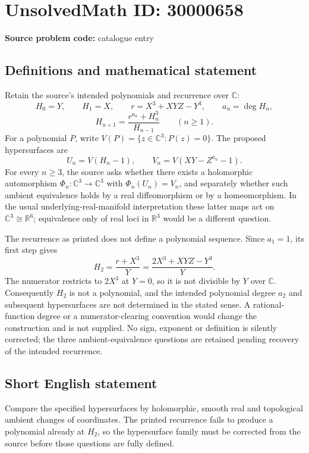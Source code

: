 \documentclass[11pt]{article}
\newcommand{\R}{\mathbb{R}}
\newcommand{\C}{\mathbb{C}}
\begin{document}
\section*{UnsolvedMath ID: 30000658}
\textbf{Source problem code:} catalogue entry
\subsection{Definitions and mathematical statement}
Retain the source's intended polynomials and recurrence over $\C$:
\[
H_0=Y,\qquad H_1=X,\qquad
r=X^3+XYZ-Y^3,\qquad a_n=\deg H_n,
\]
\[
H_{n+1}=\frac{r^{a_n}+H_n^3}{H_{n-1}}\qquad(n\geq1).
\]
For a polynomial $P$, write $V(P)=\{z\in\C^3:P(z)=0\}$. The proposed hypersurfaces are
\[
U_n=V(H_n-1),\qquad V_n=V(XY-Z^{a_n}-1).
\]
For every $n\geq3$, the source asks whether there exists a holomorphic automorphism $\Phi_n:\C^3\to\C^3$ with $\Phi_n(U_n)=V_n$, and separately whether such ambient equivalence holds by a real diffeomorphism or by a homeomorphism. In the usual underlying-real-manifold interpretation these latter maps act on $\C^3\cong\R^6$; equivalence only of real loci in $\R^3$ would be a different question.

The recurrence as printed does not define a polynomial sequence. Since $a_1=1$, its first step gives
\[
H_2=\frac{r+X^3}{Y}=\frac{2X^3+XYZ-Y^3}{Y}.
\]
The numerator restricts to $2X^3$ at $Y=0$, so it is not divisible by $Y$ over $\C$. Consequently $H_2$ is not a polynomial, and the intended polynomial degree $a_2$ and subsequent hypersurfaces are not determined in the stated sense. A rational-function degree or a numerator-clearing convention would change the construction and is not supplied. No sign, exponent or definition is silently corrected; the three ambient-equivalence questions are retained pending recovery of the intended recurrence.
\subsection{Short English statement}
Compare the specified hypersurfaces by holomorphic, smooth real and topological ambient changes of coordinates. The printed recurrence fails to produce a polynomial already at $H_2$, so the hypersurface family must be corrected from the source before those questions are fully defined.
\end{document}

